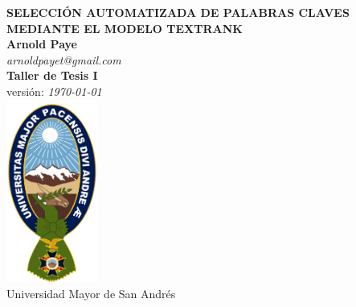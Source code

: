 \begin{titlepage}
	\vspace{3.0cm}
	\begin{center}
		{\huge\bfseries SELECCI\'ON AUTOMATIZADA DE PALABRAS CLAVES
		MEDIANTE EL MODELO TEXTRANK} \\
		\vspace{1.5cm}
		{\Large\bfseries Arnold Paye} \\ [5pt]
		\emph {arnoldpayet@gmail.com} \\[5pt]
		{\small\bfseries Taller de Tesis I} \\
		{\tiny versi\'on: \emph \today\ } \\
		\vspace{1.5cm}
		\includegraphics[width=3cm,height=6cm]{recursos/img/logo_umsa} \\
		{Universidad Mayor de San Andr\'es} 
	\end{center}
\end{titlepage}
